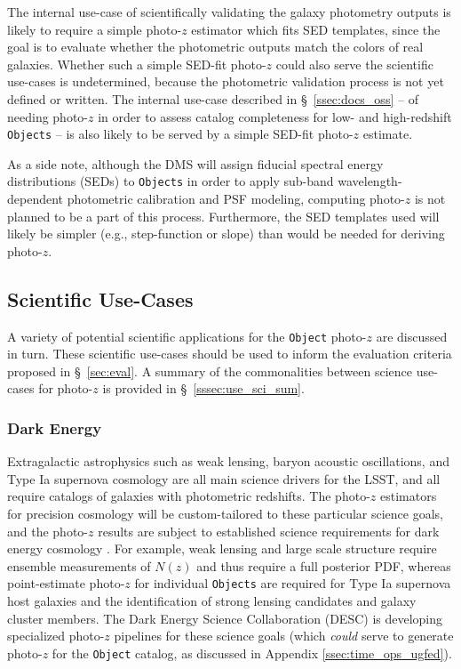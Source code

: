 \documentclass[DM,lsstdraft,toc]{lsstdoc}
\begin{document}
The internal use-case of scientifically validating the galaxy photometry outputs is likely to require a simple photo-$z$ estimator which fits SED templates, since the goal is to evaluate whether the photometric outputs match the colors of real galaxies.
Whether such a simple SED-fit photo-$z$ could also serve the scientific use-cases is undetermined, because the photometric validation process is not yet defined or written.
The internal use-case described in \S~\ref{ssec:docs_oss} -- of needing photo-$z$ in order to assess catalog completeness for low- and high-redshift {\tt Objects} -- is also likely to be served by a simple SED-fit photo-$z$ estimate.

As a side note, although the DMS will assign fiducial spectral energy distributions (SEDs) to {\tt Objects} in order to apply sub-band wavelength-dependent photometric calibration and PSF modeling, computing photo-$z$ is not planned to be a part of this process.
Furthermore, the SED templates used will likely be simpler (e.g., step-function or slope) than would be needed for deriving photo-$z$.

\subsection{Scientific Use-Cases}\label{ssec:use_sci}

A variety of potential scientific applications for the {\tt Object} photo-$z$ are discussed in turn. 
These scientific use-cases should be used to inform the evaluation criteria proposed in \S~\ref{sec:eval}.
A summary of the commonalities between science use-cases for photo-$z$ is provided in \S~\ref{sssec:use_sci_sum}.

\subsubsection{Dark Energy}\label{sssec:use_sci_de}
Extragalactic astrophysics such as weak lensing, baryon acoustic oscillations, and Type Ia supernova cosmology are all main science drivers for the LSST, and all require catalogs of galaxies with photometric redshifts.
The photo-$z$ estimators for precision cosmology will be custom-tailored to these particular science goals, and the photo-$z$ results are subject to established science requirements for dark energy cosmology \citep{2018arXiv180901669T}.
For example, weak lensing and large scale structure require ensemble measurements of $N(z)$ and thus require a full posterior PDF, whereas point-estimate photo-$z$ for individual {\tt Objects} are required for Type Ia supernova host galaxies and the identification of strong lensing candidates and galaxy cluster members. 
The Dark Energy Science Collaboration (DESC) is developing specialized photo-$z$ pipelines for these science goals (which {\it could} serve to generate photo-$z$ for the {\tt Object} catalog, as discussed in Appendix \ref{ssec:time_ops_ugfed}).
\end{document}
